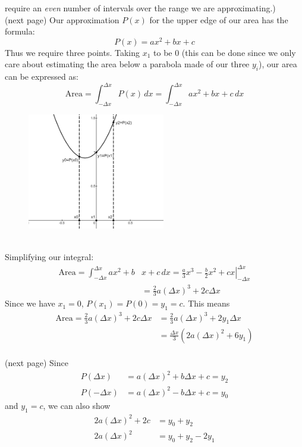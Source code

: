\documentclass{report}
\begin{document}
require an \textit{even} number of intervals over the range we are approximating.)\\
(next page)
\newpage
\noindent Our approximation $P(x)$ for the upper edge of our area has the formula:
\begin{equation*}
P(x)=ax^2+bx+c
\end{equation*}
Thus we require three points. Taking $x_1$ to be 0 (this can be done since we only care
about estimating the area below a parabola made of our three $y_i$),
our area can be expressed as:
\begin{equation*}
\text{Area}=\int_{-\Delta x}^{\Delta x}P(x)\,dx=\int_{-\Delta x}^{\Delta x}ax^2+bx+c\,dx
\end{equation*}
\begin{figure}[h]
\includegraphics[width=6cm]{Capture38}\\
\centering
{}
\end{figure}\\
Simplifying our integral:
\begin{align*}
\text{Area}=\int_{-\Delta x}^{\Delta x}ax^2+b&x+c\,dx
=\left.\frac{a}{3}x^3-\frac{b}{2}x^2+cx\right|^{\Delta x}_{-\Delta x}\\
&=\frac{2}{3}a(\Delta x)^3+2c\Delta x
\end{align*}
Since we have $x_1=0$, $P(x_1)=P(0)=y_1=c$. This means
\begin{align*}
\text{Area}=\frac{2}{3}a(\Delta x)^3+2c\Delta x
&=\frac{2}{3}a(\Delta x)^3+2y_1\Delta x\\
&=\frac{\Delta x}{3}(2a(\Delta x)^2+6y_1)
\end{align*}\\
(next page)
\newpage
\noindent Since
\begin{align*}
P(\Delta x)&=a(\Delta x)^2+b\Delta x+c=y_2\\
P(-\Delta x)&=a(\Delta x)^2-b\Delta x+c=y_0
\end{align*}
and $y_1=c$, we can also show
\begin{align*}
2a(\Delta x)^2+2c&=y_0+y_2\\
2a(\Delta x)^2&=y_0+y_2-2y_1
\end{align*}
\end{document}

